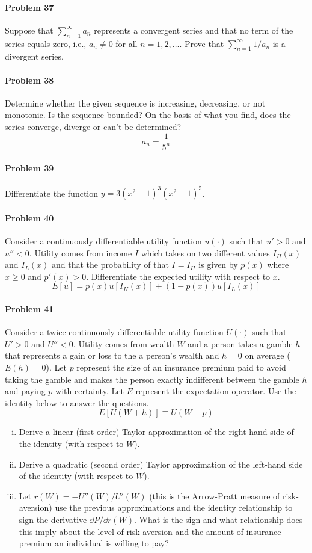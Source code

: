 \documentclass[a4paper, 11pt]{article}
\begin{document}
\paragraph{Problem 37}
Suppose that $\sum_{n=1}^{\infty} a_n$ represents a convergent series and that no term of the series equals zero, i.e., $a_n \neq 0$ for all $n=1,2, \dots$.
Prove that $\sum_{n=1}^{\infty} 1/a_n$ is a divergent series.


\paragraph{Problem 38}
Determine whether the given sequence is increasing, decreasing, or not monotonic.
Is the sequence bounded?  On the basis of what you find, does the series converge, diverge or can't be determined?
\[
	a_n = \frac{1}{5^n}
\]


\paragraph{Problem 39}
Differentiate the function $y = 3(x^2-1)^3 (x^2 + 1)^5$.


\paragraph{Problem 40}
Consider a continuously differentiable utility function $u(\cdot)$ such that $u'>0$ and $u'' < 0$.
Utility comes from income $I$ which takes on two different values $I_H(x)$ and $I_L(x)$ and that the probability of that $I=I_H$ is given by $p(x)$ where $x\geq 0$ and $p'(x)>0$.
Differentiate the expected utility with respect to $x$.
\[
	E[u] = p(x)u[I_H(x)] + (1-p(x))u[I_L(x)]
\]


\paragraph{Problem 41}
Consider a twice continuously differentiable utility function $U(\cdot)$ such that $U'>0$ and $U''< 0$.
Utility comes from wealth $W$ and a person takes a gamble $h$ that represents a gain or loss to the a person's wealth and $h=0$ on average ($E(h)=0$).
Let $p$ represent the size of an insurance premium paid to avoid taking the gamble and makes the person exactly indifferent between the gamble $h$ and paying $p$ with certainty.
Let $E$ represent the expectation operator.
Use the identity below to answer the questions.
\[
	E[U(W + h)] \equiv U(W-p)
\]
\begin{enumerate}[(i)]
	\item Derive a linear (first order) Taylor approximation of the right-hand side of the identity (with respect to $W$).
	\item Derive a quadratic (second order) Taylor approximation of the left-hand side of the identity (with respect to $W$).
	\item Let $r(W) = -U''(W)/U'(W)$ (this is the Arrow-Pratt measure of risk-aversion) use the previous approximations and the identity relationship to sign the derivative $\dd P / \dd r(W)$.  What is the sign and what relationship does this imply about the level of risk aversion and the amount of insurance premium an individual is willing to pay?
\end{enumerate}
\end{document}
